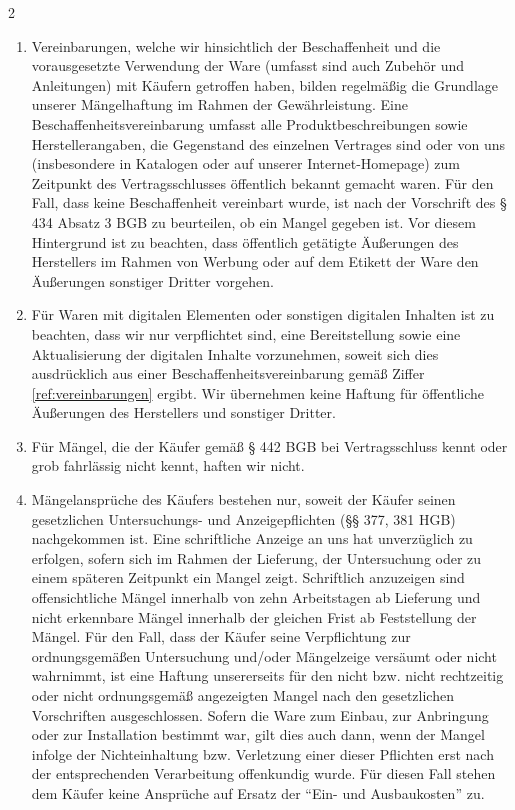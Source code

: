 \documentclass[%
    a4paper,%
    10pt,
]{scrartcl}
\begin{document}
\begin{multicols}{2}
\begin{enumerate}
\begin{enumerate}
             \item \label{ref:vereinbarungen} Vereinbarungen, welche wir hinsichtlich der Beschaffenheit und die vorausgesetzte Verwendung der Ware (umfasst sind auch Zubehör und Anleitungen) mit Käufern getroffen haben, bilden regelmäßig die Grundlage unserer Mängelhaftung im Rahmen der Gewährleistung. Eine Beschaffenheitsvereinbarung umfasst alle Produktbeschreibungen sowie Herstellerangaben, die Gegenstand des einzelnen Vertrages sind oder von uns (insbesondere in Katalogen oder auf unserer Internet-Homepage) zum Zeitpunkt des Vertragsschlusses öffentlich bekannt gemacht waren. Für den Fall, dass keine Beschaffenheit vereinbart wurde, ist nach der Vorschrift des § 434 Absatz 3 BGB zu beurteilen, ob ein Mangel gegeben ist. Vor diesem Hintergrund ist zu beachten, dass öffentlich getätigte Äußerungen des Herstellers im Rahmen von Werbung oder auf dem Etikett der Ware den Äußerungen sonstiger Dritter vorgehen.
             \item Für Waren mit digitalen Elementen oder sonstigen digitalen Inhalten ist zu beachten, dass wir nur verpflichtet sind, eine Bereitstellung sowie eine Aktualisierung der digitalen Inhalte vorzunehmen, soweit sich dies ausdrücklich aus einer Beschaffenheitsvereinbarung gemäß Ziffer \ref{ref:vereinbarungen} ergibt. Wir übernehmen keine Haftung für öffentliche Äußerungen des Herstellers und sonstiger Dritter.
             \item Für Mängel, die der Käufer gemäß § 442 BGB bei Vertragsschluss kennt oder grob fahrlässig nicht kennt, haften wir nicht.
             \item Mängelansprüche des Käufers bestehen nur, soweit der Käufer seinen gesetzlichen Untersuchungs- und Anzeigepflichten (§§ 377, 381 HGB) nachgekommen ist. Eine schriftliche Anzeige an uns hat unverzüglich zu erfolgen, sofern sich im Rahmen der Lieferung, der Untersuchung oder zu einem späteren Zeitpunkt ein Mangel zeigt. Schriftlich anzuzeigen sind offensichtliche Mängel innerhalb von zehn Arbeitstagen ab Lieferung und nicht erkennbare Mängel innerhalb der gleichen Frist ab Feststellung der Mängel. Für den Fall, dass der Käufer seine Verpflichtung zur ordnungsgemäßen Untersuchung und/oder Mängelzeige versäumt oder nicht wahrnimmt, ist eine Haftung unsererseits für den nicht bzw. nicht rechtzeitig oder nicht ordnungsgemäß angezeigten Mangel nach den gesetzlichen Vorschriften ausgeschlossen. Sofern die Ware zum Einbau, zur Anbringung oder zur Installation bestimmt war, gilt dies auch dann, wenn der Mangel infolge der Nichteinhaltung bzw. Verletzung einer dieser Pflichten erst nach der entsprechenden Verarbeitung offenkundig wurde. Für diesen Fall stehen dem Käufer keine Ansprüche auf Ersatz der \enquote{Ein- und Ausbaukosten} zu.

\end{enumerate}
\end{enumerate}
\end{multicols}
\end{document}
